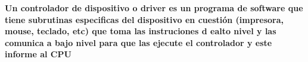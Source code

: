 \documentclass[12pt]{article}
\begin{document}
\begin{enumerate}
    \textbf{Un controlador de dispositivo o driver es un programa de software que tiene subrutinas especificas del dispositivo en cuestión (impresora, mouse, teclado, etc) que toma las
    instruciones d ealto nivel y las comunica a bajo nivel para que las ejecute el controlador y este informe al CPU} 
\end{enumerate}
\end{document}
